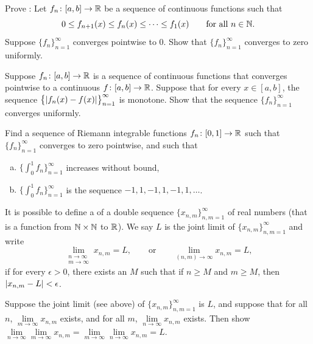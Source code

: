 \begin{exercise}[Hard] \label{exercise:dinisthm}
Prove \emph{}:
Let $f_n \colon [a,b] \to {\mathbb{R}}$ be a sequence of continuous functions such that
\begin{equation*}
0 \leq f_{n+1}(x) \leq f_n(x) \leq \cdots \leq f_1(x) 
\qquad \text{for all } n \in {\mathbb{N}}.
\end{equation*}
Suppose $\{ f_n \}_{n=1}^\infty$ converges pointwise to $0$.
Show that $\{ f_n \}_{n=1}^\infty$ converges to zero uniformly.
\end{exercise}

\begin{exercise}
Suppose $f_n \colon [a,b] \to {\mathbb{R}}$ is a sequence of continuous
functions that
converges pointwise
to a continuous $f \colon [a,b] \to {\mathbb{R}}$.  Suppose that
for every $x \in [a,b]$,
the sequence $\bigl\{ \left\lvert {f_n(x)-f(x)} \right\rvert \bigr\}_{n=1}^\infty$ is monotone.
Show that the sequence $\{f_n\}_{n=1}^\infty$ converges uniformly.
\end{exercise}

\begin{exercise}
\pagebreak[3]
Find a sequence of Riemann integrable functions $f_n \colon [0,1] \to {\mathbb{R}}$ such
that $\{ f_n \}_{n=1}^\infty$ converges to zero pointwise, and such that
\begin{enumerate}[a)]
\item
$\bigl\{ \int_0^1 f_n \bigr\}_{n=1}^\infty$ increases without bound,
\item
$\bigl\{ \int_0^1 f_n \bigr\}_{n=1}^\infty$ is the sequence $-1,1,-1,1,-1,1, \ldots$.
\end{enumerate}
\end{exercise}

\begin{exnote}
It is possible to define a 
\emph{} of a double sequence
$\{ x_{n,m} \}_{n,m=1}^\infty$ of real
numbers (that is a function from ${\mathbb{N}} \times {\mathbb{N}}$ to ${\mathbb{R}}$).
We say $L$ is the joint limit of $\{ x_{n,m} \}_{n,m=1}^\infty$ and write
\begin{equation*}
\lim_{\substack{n\to\infty\\m\to\infty}}
x_{n,m} = L ,
\qquad
\text{or}
\qquad
\lim_{(n,m) \to \infty}
x_{n,m} = L ,
\end{equation*}
if for every $\epsilon > 0$, there
exists an $M$ such that if $n \geq M$ and $m \geq M$, then
$\left\lvert {x_{n,m} - L} \right\rvert < \epsilon$.
\end{exnote}

\begin{exercise}
Suppose the joint limit (see above) of $\{ x_{n,m} \}_{n,m=1}^\infty$ is $L$, and suppose
that for all $n$, $\lim\limits_{m \to \infty} x_{n,m}$ exists,
and for all $m$, $\lim\limits_{n \to \infty} x_{n,m}$ exists.  Then show
$\lim\limits_{n\to\infty}\lim\limits_{m \to \infty} x_{n,m}
=
\lim\limits_{m\to\infty}\lim\limits_{n \to \infty} x_{n,m} = L$.
\end{exercise}

